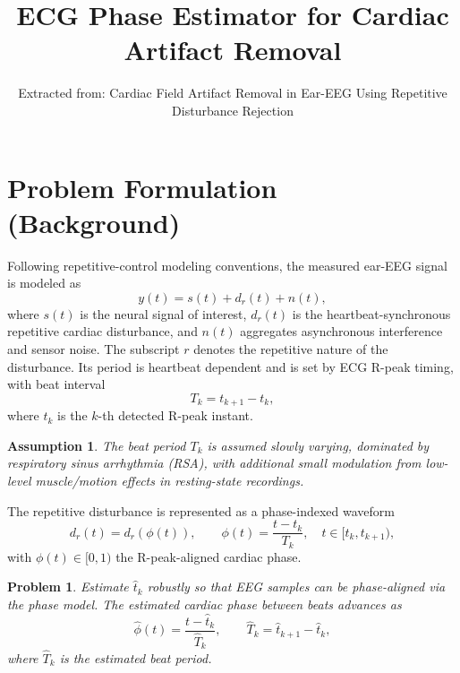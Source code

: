 \documentclass[11pt]{article}
\title{ECG Phase Estimator for Cardiac Artifact Removal}
\author{Extracted from: Cardiac Field Artifact Removal in Ear-EEG Using Repetitive Disturbance Rejection}
\date{}
\newtheorem{assumption}{Assumption}
\newtheorem{problem}{Problem}
\begin{document}
\maketitle


\section*{Problem Formulation (Background)}

Following repetitive-control modeling conventions, the measured ear-EEG signal is modeled as
\begin{equation}
y(t) = s(t) + d_r(t) + n(t),
\label{eq:meas}
\end{equation}
where $s(t)$ is the neural signal of interest, $d_r(t)$ is the heartbeat-synchronous repetitive 
cardiac disturbance, and $n(t)$ aggregates asynchronous interference and sensor noise. The subscript 
$r$ denotes the repetitive nature of the disturbance. Its period is heartbeat dependent and is set by 
ECG R-peak timing, with beat interval
\begin{equation}
T_k = t_{k+1} - t_k,
\label{eq:Tk}
\end{equation}
where $t_k$ is the $k$-th detected R-peak instant.

\begin{assumption}\label{asm:tk_slowly_varying}
The beat period $T_k$ is assumed slowly varying, dominated by respiratory sinus arrhythmia (RSA), with
additional small modulation from low-level muscle/motion effects in resting-state recordings.
\end{assumption}

The repetitive disturbance is represented as a phase-indexed waveform
\begin{equation}
d_r(t) = d_r\!\left(\phi(t)\right), \qquad
\phi(t) = \frac{t - t_k}{T_k}, \quad t \in [t_k, t_{k+1}),
\label{eq:phase_model}
\end{equation}
with $\phi(t)\in[0,1)$ the R-peak-aligned cardiac phase.

\begin{problem}\label{prob:timing_estimation}
Estimate $\hat{t}_k$ robustly so that EEG samples can be phase-aligned via the phase model.
The estimated cardiac phase between beats advances as
\begin{equation}
\hat{\phi}(t) = \frac{t - \hat{t}_k}{\hat{T}_k}, \qquad \hat{T}_k = \hat{t}_{k+1} - \hat{t}_k,
\label{eq:phi_hat}
\end{equation}
where $\hat{T}_k$ is the estimated beat period.
\end{problem}
\end{document}
